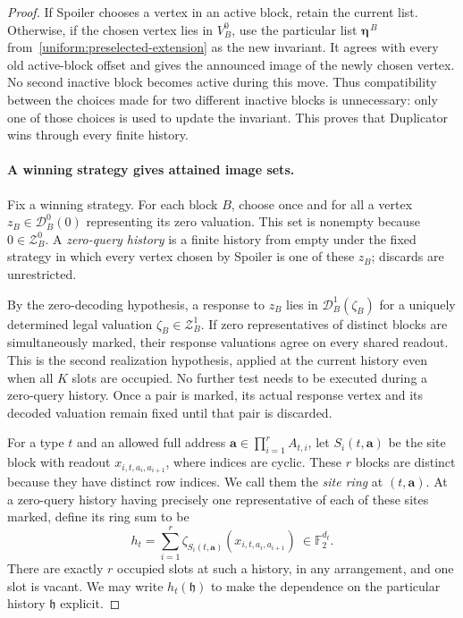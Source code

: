 \documentclass[11pt]{article}
\theoremstyle{definition}
\begin{document}
\begin{proof}
If Spoiler chooses a vertex in an active block, retain the current list.
Otherwise, if the chosen vertex lies in $V_B^0$, use the particular list
$\boldsymbol\eta^{\,B}$ from~\eqref{uniform:preselected-extension} as the
new invariant.  It agrees with every old active-block offset and gives the
announced image of the newly chosen vertex.  No second inactive block
becomes active during this move.  Thus compatibility between the choices
made for two different inactive blocks is unnecessary: only one of those
choices is used to update the invariant.  This proves that Duplicator wins
through every finite history.

\paragraph{A winning strategy gives attained image sets.}
Fix a winning strategy.  For each block \(B\), choose once and for all a
vertex \(z_B\in\mathcal D_B^0(0)\) representing its zero valuation.
This set is nonempty because \(0\in\mathcal Z_B^0\).  A
\emph{zero-query history} is a finite history from empty under the fixed
strategy in which every vertex chosen by Spoiler is one of these $z_B$;
discards are unrestricted.

By the zero-decoding hypothesis, a response to \(z_B\) lies in
\(\mathcal D_B^1(\zeta_B)\) for a uniquely determined legal valuation
$\zeta_B\in\mathcal Z_B^1$.  If zero representatives of distinct blocks are
simultaneously marked, their response valuations agree on every shared
readout. This is the second realization hypothesis, applied at the
current history even when all $K$ slots are occupied. No further test
needs to be executed during a zero-query history. Once a pair is marked,
its actual response vertex and its decoded valuation remain fixed until
that pair is discarded.

For a type $t$ and an allowed full address
$\mathbf a\in\prod_{i=1}^r A_{t,i}$, let
$S_i(t,\mathbf a)$ be the site block with readout
$x_{i,t,a_i,a_{i+1}}$, where indices are cyclic.  These $r$ blocks are
distinct because they have distinct row indices.  We call them the
\emph{site ring} at $(t,\mathbf a)$.  At a zero-query history having
precisely one representative of each of these sites marked, define its
ring sum to be
\begin{equation}
\label{uniform:ring-sum}
 h_t=\sum_{i=1}^r
 \zeta_{S_i(t,\mathbf a)}(x_{i,t,a_i,a_{i+1}})
 \ \in\mathbb F_2^{d_t}.
\end{equation}
There are exactly $r$ occupied slots at such a history, in any arrangement,
and one slot is vacant.  We may write $h_t(\mathfrak h)$ to make the
dependence on the particular history $\mathfrak h$ explicit.


\end{proof}
\end{document}
